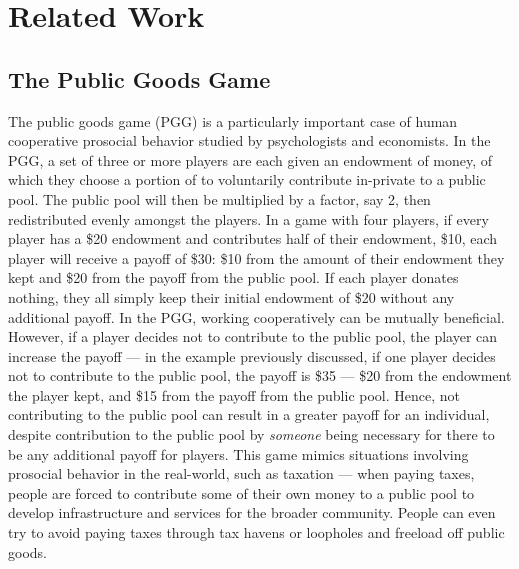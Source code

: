 \section{Related Work}

\subsection{The Public Goods Game}

The public goods game (PGG) is a particularly important case of human cooperative prosocial behavior studied by psychologists and economists. In the PGG, a set of three or more players are each given an endowment of money, of which they choose a portion of to voluntarily contribute in-private to a public pool. The public pool will then be multiplied by a factor, say 2, then redistributed evenly amongst the players. In a game with four players, if every player has a \$20 endowment and contributes half of their endowment, \$10, each player will receive a payoff of \$30: \$10 from the amount of their endowment they kept and \$20 from the payoff from the public pool. If each player donates nothing, they all simply keep their initial endowment of \$20 without any additional payoff. In the PGG, working cooperatively can be mutually beneficial. However, if a player decides not to contribute to the public pool, the player can increase the payoff — in the example previously discussed, if one player decides not to contribute to the public pool, the payoff is \$35 — \$20 from the endowment the player kept, and \$15 from the payoff from the public pool. Hence, not contributing to the public pool can result in a greater payoff for an individual, despite contribution to the public pool by \textit{someone} being necessary for there to be any additional payoff for players. This game mimics situations involving prosocial behavior in the real-world, such as taxation — when paying taxes, people are forced to contribute some of their own money to a public pool to develop infrastructure and services for the broader community. People can even try to avoid paying taxes through tax havens or loopholes and freeload off public goods.

